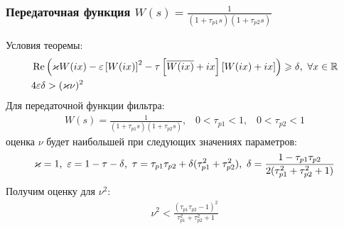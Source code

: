 \documentclass{beamer}
\begin{document}
\begin{frame}
\frametitle{Передаточная функция $W(s) = \frac{1}{(1+\tau_{p1}s)(1+\tau_{p2}s)}$}
Условия теоремы:\vspace{-2mm}
 \begin{align*}
&\operatorname{Re}\left( \varkappa W(ix)- \varepsilon\left[W(ix)\right]^2-\tau\left[ \overline{W(ix)}+ix \right]\left[W(ix)+ix \right]\right) \geqslant \delta \text{,}\enskip\forall x \in \mathbb{R}\\
&4\varepsilon\delta > (\varkappa\nu)^2
\end{align*}
Для передаточной функции фильтра:
 \begin{equation}\label{filter1}
 \begin{aligned}
W(s) = \frac{1}{(1+\tau_{p1}s)(1+\tau_{p2}s)}\text{,} \quad0 < \tau_{p1} < 1 \text{,} \quad 0 < \tau_{p2} <1
 \end{aligned}
\end{equation}
оценка $\nu$ будет наибольшей при следующих значениях параметров:
 \begin{equation*}
 \begin{aligned}
\varkappa = 1 \text{,} \enskip  \varepsilon = 1 - \tau - \delta \text{,} \enskip \tau = \tau_{p1}\tau_{p2} + \delta(\tau_{p1}^2+\tau_{p2}^2) \text{,} \enskip \delta = \frac{1-\tau_{p1}\tau_{p2}}{2(\tau_{p1}^2+\tau_{p2}^2 + 1)}
 \end{aligned}
\end{equation*}
Получим оценку для $\nu^2$:
\begin{equation}
 \begin{aligned}
\nu^2 < \frac{(\tau_{p1}\tau_{p2} - 1)^2}{\tau_{p1}^2 + \tau_{p2}^2 + 1}
 \end{aligned}
\end{equation}
\end{frame}

\end{document}
